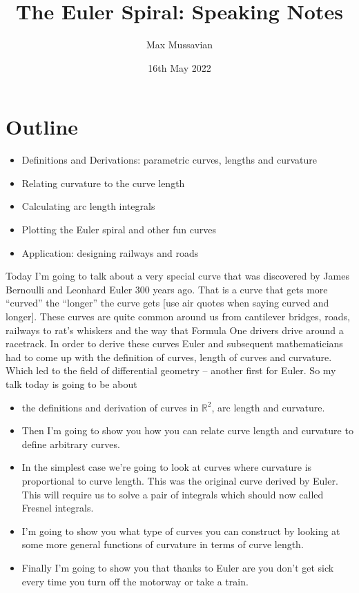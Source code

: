 \documentclass[]{article} %
\title{The Euler Spiral: Speaking Notes}
\author{Max Mussavian}
\theoremstyle{definition}
\theoremstyle{theorem}
\begin{document}
	\date{16th May 2022}
    \maketitle
\section{Outline}
\begin{tcolorbox}
	\begin{itemize}
		\item Definitions and Derivations: parametric curves, lengths and curvature
		\item Relating curvature to the curve length
		\item Calculating arc length integrals
		\item Plotting the Euler spiral and other fun curves
		\item Application: designing railways and roads
	\end{itemize}
\end{tcolorbox}
Today I'm going to talk about a very special curve that was discovered by James Bernoulli and Leonhard Euler 300 years ago. That is a curve that gets more “curved” the “longer” the curve gets [use air quotes when saying curved and longer]. 
These curves are quite common around us from cantilever bridges, roads, railways to rat’s whiskers and the way that Formula One drivers drive around a racetrack. In order to derive these curves Euler and subsequent mathematicians had to come up with the definition of curves, length of curves and curvature. Which led to the field of differential geometry -- another first for Euler.
So my talk today is going to be about
\begin{itemize}
\item	the definitions and derivation of curves in $\mathbb{R}^2$, arc length and curvature.
\item Then I'm going to show you how you can relate curve length and curvature to define arbitrary curves.
\item In the simplest case we're going to look at curves where curvature is proportional to curve length. This was the original curve derived by Euler. This will require us to solve a pair of integrals which should now called Fresnel integrals.
\item I'm going to show you what type of curves you can construct by looking at some more general functions of curvature in terms of curve length.
\item Finally I'm going to show you that thanks to Euler are you don't get sick every time you turn off the motorway or take a train.
\end{itemize}
\end{document}
